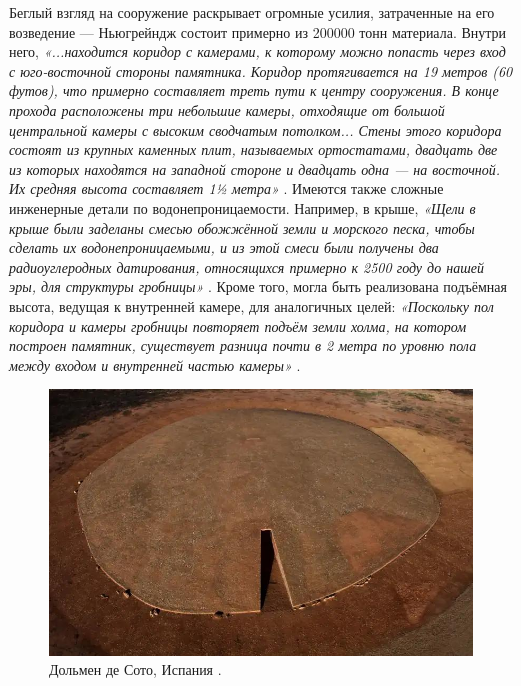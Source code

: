 \documentclass[10pt,twocolumn,letterpaper]{article}
\begin{document}
Беглый взгляд на сооружение раскрывает огромные усилия, затраченные на его возведение — Ньюгрейндж состоит примерно из 200000 тонн материала. Внутри него, \textit{«...находится коридор с камерами, к которому можно попасть через вход с юго-восточной стороны памятника. Коридор протягивается на 19 метров (60 футов), что примерно составляет треть пути к центру сооружения. В конце прохода расположены три небольшие камеры, отходящие от большой центральной камеры с высоким сводчатым потолком... Стены этого коридора состоят из крупных каменных плит, называемых ортостатами, двадцать две из которых находятся на западной стороне и двадцать одна — на восточной. Их средняя высота составляет 1½ метра»} \cite{70}. Имеются также сложные инженерные детали по водонепроницаемости. Например, в крыше, \textit{«Щели в крыше были заделаны смесью обожжённой земли и морского песка, чтобы сделать их водонепроницаемыми, и из этой смеси были получены два радиоуглеродных датирования, относящихся примерно к 2500 году до нашей эры, для структуры гробницы»} \cite{71}. Кроме того, могла быть реализована подъёмная высота, ведущая к внутренней камере, для аналогичных целей: \textit{«Поскольку пол коридора и камеры гробницы повторяет подъём земли холма, на котором построен памятник, существует разница почти в 2 метра по уровню пола между входом и внутренней частью камеры»} \cite{71}.

\begin{figure}[t]
\begin{center}
   \includegraphics[width=1\linewidth]{dolmen.jpg}
\end{center}
   \caption{Дольмен де Сото, Испания \cite{53}.}
\label{fig:9}
\label{fig:onecol}
\end{figure}
\end{document}
